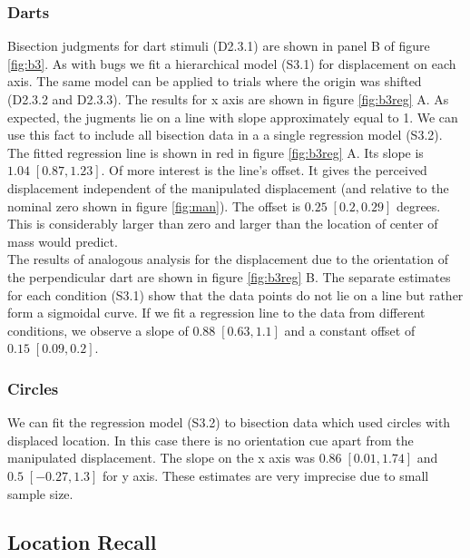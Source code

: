 \documentclass[10pt]{article}
\begin{document}
\subsubsection*{Darts}
Bisection judgments for dart stimuli (D2.3.1) are shown in panel B of figure \ref{fig:b3}. 
As with bugs we fit a hierarchical model (S3.1) for displacement on each axis. 
The same model can be applied to trials where the origin was shifted (D2.3.2 and D2.3.3). The results for x axis are shown in figure \ref{fig:b3reg} A. 
As expected, the jugments lie on a line with slope approximately equal to 1. 
We can use this fact to include all bisection data in a a single regression model (S3.2). 
The fitted regression line is shown in red in figure \ref{fig:b3reg} A. Its slope is $1.04\; [0.87,1.23]$. 
Of more interest is the line's offset.
It gives the perceived displacement independent of the manipulated displacement (and relative to the nominal zero shown in figure \ref{fig:man}). 
The offset is $0.25\; [0.2,0.29]$ degrees. 
This is considerably larger than zero and larger than the location of center of mass would predict. 
\\
The results of analogous analysis for the displacement due to the orientation of the perpendicular dart are shown in figure \ref{fig:b3reg} B. 
The separate estimates for each condition (S3.1) show that the data points do not lie on a line but rather form a sigmoidal curve. 
If we fit a regression line to the data from different conditions, we observe a slope of $0.88\; [0.63,1.1]$ and a constant offset of $0.15\; [0.09,0.2]$.

\subsubsection*{Circles}
We can fit the regression model (S3.2) to bisection data which used circles with displaced location. 
In this case there is no orientation cue apart from the manipulated displacement. 
The slope on the x axis was $0.86\; [0.01,1.74]$ and $0.5 \;[-0.27,1.3]$ for y axis. These estimates are very imprecise due to small sample size.

\subsection*{Location Recall} 
\end{document}
